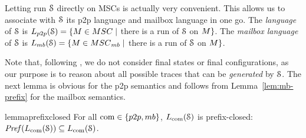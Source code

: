 \documentclass[a4paper,UKenglish,cleveref, autoref, thm-restate]{lipics-v2021}
\begin{document}
Letting run $\mathcal{S}$ directly on MSCs is actually very convenient.
This allows us to associate with $\mathcal{S}$ its p2p language and mailbox language
in one go. The \emph{\pp language} of $\mathcal{S}$ is $\ppL{\Sys} = \{\msc \in \ppMSCs \mid$ there is a run of $\mathcal{S}$ on $M\}$.
The \emph{mailbox language} of $\mathcal{S}$ is $\mbL{\Sys} = \{\msc \in \mbMSCs \mid$ there is a run of $\mathcal{S}$ on $M\}$.

Note that, following \cite{DBLP:conf/cav/BouajjaniEJQ18,DBLP:conf/fossacs/GiustoLL20},
we do not consider final states or final configurations, as our purpose is to
reason about all possible
traces that can be \emph{generated} by $\mathcal{S}$.
The next lemma is obvious for the p2p semantics and follows from Lemma~\ref{lem:mb-prefix} for
	the mailbox semantics.

\begin{restatable}{lemma}{prefixclosed}
For all $\comsymb \in \{\ppsymb, \mbsymb\}$, $L_{\textup{com}}(\mathcal{S})$ is prefix-closed:
$\mathit{Pref}(L_{\textup{com}}(\mathcal{S})) \subseteq L_{\textup{com}}(\mathcal{S})$.
\end{restatable}
\end{document}

